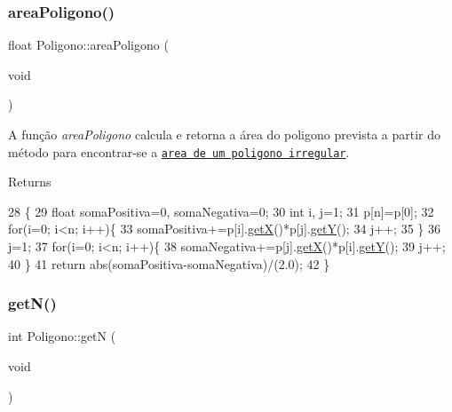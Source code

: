 \subsubsection{\texorpdfstring{area\+Poligono()}{areaPoligono()}}
{\footnotesize\ttfamily float Poligono\+::area\+Poligono (\begin{DoxyParamCaption}\item[{void}]{ }\end{DoxyParamCaption})}



A função {\itshape area\+Poligono} calcula e retorna a área do poligono prevista a partir do método para encontrar-\/se a \href{https://pt.wikihow.com/Calcular-a-%C3%81rea-de-um-Pol%C3%ADgono}{\tt area de um poligono irregular}. 

\begin{DoxyReturn}{Returns}

\end{DoxyReturn}

\begin{DoxyCode}
28                             \{
29     \textcolor{keywordtype}{float} somaPositiva=0, somaNegativa=0;
30     \textcolor{keywordtype}{int} i, j=1;
31     p[n]=p[0];
32     \textcolor{keywordflow}{for}(i=0; i<n; i++)\{
33         somaPositiva+=p[i].\hyperlink{class_point_acc27466778cc87a662bba40268c4c0c8}{getX}()*p[j].\hyperlink{class_point_a3cccbca94719ddde353cce86ce0e2f64}{getY}();
34         j++;
35     \}
36     j=1;
37     \textcolor{keywordflow}{for}(i=0; i<n; i++)\{
38         somaNegativa+=p[j].\hyperlink{class_point_acc27466778cc87a662bba40268c4c0c8}{getX}()*p[i].\hyperlink{class_point_a3cccbca94719ddde353cce86ce0e2f64}{getY}();
39         j++;
40     \}
41     \textcolor{keywordflow}{return} abs(somaPositiva-somaNegativa)/(2.0);
42 \}
\end{DoxyCode}
\mbox{\label{class_poligono_a56257204345b9be3bb5d5fbe45ce63f1}} 
\subsubsection{\texorpdfstring{get\+N()}{getN()}}
{\footnotesize\ttfamily int Poligono\+::getN (\begin{DoxyParamCaption}\item[{void}]{ }\end{DoxyParamCaption})}



